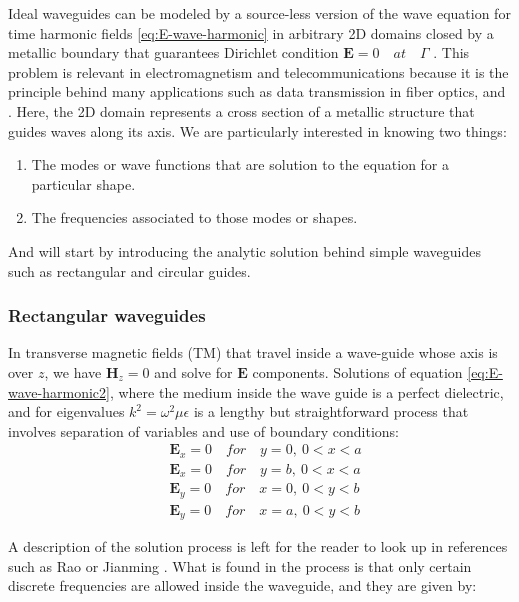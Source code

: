 Ideal wave\remove[SEC]{-}guides can be modeled by a source-less version of the wave equation for time harmonic fields \ref{eq:E-wave-harmonic} in arbitrary 2D domains closed by a metallic  boundary that guarantees Dirichlet condition $\mathbf{E} = 0\quad at\quad \Gamma$ . This problem is relevant in electromagnetism and telecommunications because it is the principle behind many applications such as data transmission in fiber optics, and . Here, the 2D domain represents a cross section of a metallic structure that guides waves along its axis. We are particularly interested in knowing two things:
\begin{enumerate}
\item The modes or wave functions that are solution to the equation for a particular shape.
\item The frequencies associated to those modes or shapes. 
\end{enumerate}
And will start by introducing the analytic solution behind simple wave\remove[SEC]{-}guides such as rectangular and circular guides.

\subsubsection{Rectangular waveguides} 

In transverse magnetic fields (TM) that travel inside a wave-guide whose axis is over $z$, we have $\mathbf{H}_z = 0$ and solve for $\mathbf{E}$ components. 
Solutions of equation \ref{eq:E-wave-harmonic2}, where the medium inside the wave guide is a perfect dielectric, and  for eigenvalues $k^2 = \omega^2\mu\epsilon$ is a lengthy but straightforward process that involves separation of variables and use of boundary conditions:
\begin{align}
&\mathbf{E}_x = 0 \quad for \quad y=0,\ 0<x<a\\
&\mathbf{E}_x = 0 \quad for \quad y=b,\ 0<x<a\\
&\mathbf{E}_y = 0 \quad for \quad x=0,\ 0<y<b\\
&\mathbf{E}_y = 0 \quad for \quad x=a,\ 0<y<b
\label{eq:square_bc}
\end{align}

A description of the solution process is left for the reader to look up in references such as Rao  \cite{Rao2004} or Jianming \cite{Jin2010}. What is found in the process is that only certain discrete frequencies are allowed inside the wave\remove[SEC]{-}guide, and they are given by:

